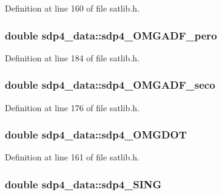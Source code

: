Definition at line 160 of file satlib.\-h.

\hypertarget{structsdp4__data_a9f123c63a37702abd13863ce502113a9}{
\subsubsection[{sdp4\-\_\-\-O\-M\-G\-A\-D\-F\-\_\-pero}]{\setlength{\rightskip}{0pt plus 5cm}double sdp4\-\_\-data\-::sdp4\-\_\-\-O\-M\-G\-A\-D\-F\-\_\-pero}}\label{structsdp4__data_a9f123c63a37702abd13863ce502113a9}


Definition at line 184 of file satlib.\-h.

\hypertarget{structsdp4__data_a0f1710142828c31b1ed8932b5827a3e2}{
\subsubsection[{sdp4\-\_\-\-O\-M\-G\-A\-D\-F\-\_\-seco}]{\setlength{\rightskip}{0pt plus 5cm}double sdp4\-\_\-data\-::sdp4\-\_\-\-O\-M\-G\-A\-D\-F\-\_\-seco}}\label{structsdp4__data_a0f1710142828c31b1ed8932b5827a3e2}


Definition at line 176 of file satlib.\-h.

\hypertarget{structsdp4__data_a13026e5e9ea296934b2da9b986cdabb6}{
\subsubsection[{sdp4\-\_\-\-O\-M\-G\-D\-O\-T}]{\setlength{\rightskip}{0pt plus 5cm}double sdp4\-\_\-data\-::sdp4\-\_\-\-O\-M\-G\-D\-O\-T}}\label{structsdp4__data_a13026e5e9ea296934b2da9b986cdabb6}


Definition at line 161 of file satlib.\-h.

\hypertarget{structsdp4__data_a17ac570d54ff789e9af6f1e5006fb7e2}{
\subsubsection[{sdp4\-\_\-\-S\-I\-N\-G}]{\setlength{\rightskip}{0pt plus 5cm}double sdp4\-\_\-data\-::sdp4\-\_\-\-S\-I\-N\-G}}\label{structsdp4__data_a17ac570d54ff789e9af6f1e5006fb7e2}


